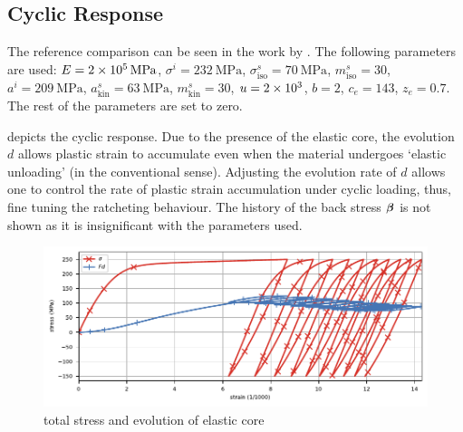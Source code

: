 \subsection{Cyclic Response}
The reference comparison can be seen in the work by \citet{Hassan2008,Hashiguchi2017a}.
The following parameters are used:
$E=\SI{2E5}{\mega\pascal}$,
$\sigma^i=\SI{232}{\mega\pascal}$,
$\sigma^s_\text{iso}=\SI{70}{\mega\pascal}$,
$m^s_\text{iso}=\num{30}$,
$a^i=\SI{209}{\mega\pascal}$,
$a^s_\text{kin}=\SI{63}{\mega\pascal}$,
$m^s_\text{kin}=\num{30}$,
$u=\num{2E3}$,
$b=\num{2}$,
$c_e=\num{143}$,
$z_e=\num{0.7}$.
The rest of the parameters are set to zero.

 depicts the cyclic response.
Due to the presence of the elastic core, the evolution $d$ allows plastic strain to accumulate even when the material undergoes `elastic unloading' (in the conventional sense).
Adjusting the evolution rate of $d$ allows one to control the rate of plastic strain accumulation under cyclic loading, thus, fine tuning the ratcheting behaviour.
The history of the back stress $\bm{\beta}$ is not shown as it is insignificant with the parameters used.
\begin{figure}[htb]
\centering
\includegraphics{PIC/CYCLIC/cyclic.total.pdf}
\caption{total stress and evolution of elastic core}\label{fig:cyclic_total}
\end{figure}


